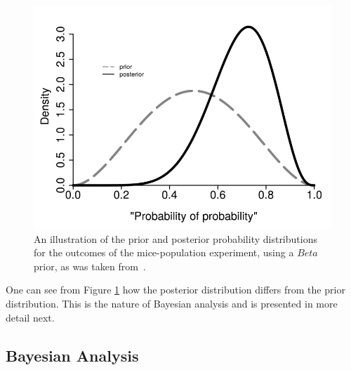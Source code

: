 \begin{figure}[htbp]
      \includegraphics[width=\textwidth]{images/mouse_experiment_distributions.jpg}
      \caption{An illustration of the prior and posterior probability distributions for the outcomes of the mice-population experiment, using a $Beta$ prior, as was taken from~\cite{ref:hackenberger:2019}.}
      \label{fig:probability:bayesian_statistics:mouse_distributions}
\end{figure}

One can see from Figure \ref{fig:probability:bayesian_statistics:mouse_distributions} how the posterior distribution differs from the prior distribution. This is the nature of Bayesian analysis and is presented in more detail next.

\subsection{Bayesian Analysis}
\label{sec:probability:bayesian_statistics:bayesian_analysis}

